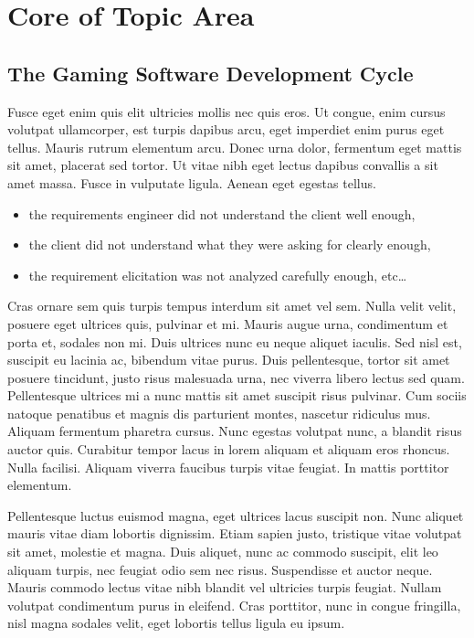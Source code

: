 \section{Core of Topic Area}

\subsection{The Gaming Software Development Cycle}
Fusce eget enim quis elit ultricies mollis nec quis eros. Ut congue, enim cursus volutpat ullamcorper, est turpis dapibus arcu, eget imperdiet enim purus eget tellus. Mauris rutrum elementum arcu. Donec urna dolor, fermentum eget mattis sit amet, placerat sed tortor. Ut vitae nibh eget lectus dapibus convallis a sit amet massa. Fusce in vulputate ligula. Aenean eget egestas tellus.

        \begin{itemize}
          \item the requirements engineer did not understand the client well enough,
          \item the client did not understand what they were asking for clearly enough,
          \item the requirement elicitation was not analyzed carefully enough, etc\ldots
        \end{itemize}


Cras ornare sem quis turpis tempus interdum sit amet vel sem. Nulla velit velit, posuere eget ultrices quis, pulvinar et mi. Mauris augue urna, condimentum et porta et, sodales non mi. Duis ultrices nunc eu neque aliquet iaculis. Sed nisl est, suscipit eu lacinia ac, bibendum vitae purus. Duis pellentesque, tortor sit amet posuere tincidunt, justo risus malesuada urna, nec viverra libero lectus sed quam. Pellentesque ultrices mi a nunc mattis sit amet suscipit risus pulvinar. Cum sociis natoque penatibus et magnis dis parturient montes, nascetur ridiculus mus. Aliquam fermentum pharetra cursus. Nunc egestas volutpat nunc, a blandit risus auctor quis. Curabitur tempor lacus in lorem aliquam et aliquam eros rhoncus. Nulla facilisi. Aliquam viverra faucibus turpis vitae feugiat. In mattis porttitor elementum.

Pellentesque luctus euismod magna, eget ultrices lacus suscipit non. Nunc aliquet mauris vitae diam lobortis dignissim. Etiam sapien justo, tristique vitae volutpat sit amet, molestie et magna. Duis aliquet, nunc ac commodo suscipit, elit leo aliquam turpis, nec feugiat odio sem nec risus. Suspendisse et auctor neque. Mauris commodo lectus vitae nibh blandit vel ultricies turpis feugiat. Nullam volutpat condimentum purus in eleifend. Cras porttitor, nunc in congue fringilla, nisl magna sodales velit, eget lobortis tellus ligula eu ipsum.

